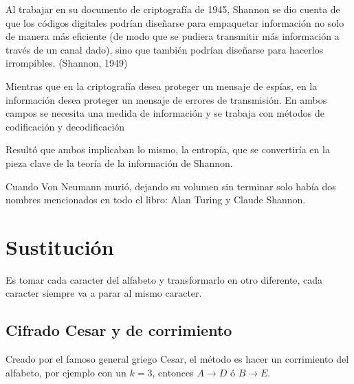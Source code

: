 \documentclass[12pt, fleqn]{report}                             %
\newcommand \Quote              {\qq}                           %
\theoremstyle{break}                                            %
\begin{document}
                Al trabajar en su documento de criptografía de 1945, Shannon se dio cuenta de que los códigos digitales
                podrían diseñarse para empaquetar información no solo de manera más eficiente 
                (de modo que se pudiera transmitir más información a través de un canal dado), 
                sino que también podrían diseñarse para hacerlos irrompibles. (Shannon, 1949) 
                
                Mientras que en la criptografía desea proteger un mensaje de espías, 
                en la información desea proteger un mensaje de errores de transmisión. 
                En ambos campos se necesita una medida de información y se trabaja con métodos de
                codificación y decodificación
                
                Resultó que ambos implicaban lo mismo, la entropía, que se convertiría en la pieza clave de la
                teoría de la información de Shannon.

                {\large
                Cuando Von Neumann murió, dejando su volumen\Quote{
                    The Computer and the Brain} sin terminar
                solo había dos nombres mencionados en todo el libro: Alan Turing y Claude Shannon.}



    

    \chapter{Sustitución}

        Es tomar cada caracter del alfabeto y transformarlo en otro diferente, cada caracter
        siempre va a parar al mismo caracter.

        \clearpage
        \section{Cifrado Cesar y de corrimiento}

            Creado por el famoso general griego Cesar, el método es hacer un corrimiento del alfabeto, por ejemplo con un $k=3$, 
            entonces $A \to D$ ó $B \to E$.
\end{document}
